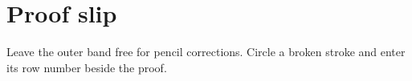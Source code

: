 \documentclass[10pt]{article}
\begin{document}
\section*{Proof slip}
Leave the outer band free for pencil corrections. Circle a broken stroke and enter its row number beside the proof.
\end{document}
